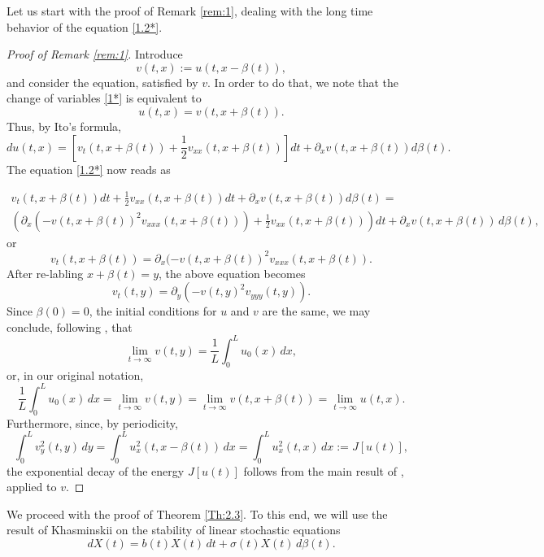 \documentclass[a4paper,12pt]{article}
\numberwithin{equation}{section}
\def\d{\partial}
\begin{document}
Let us start with the proof of Remark \ref{rem:1}, dealing with the long time behavior of the equation \eqref{1.2*}.
\begin{proof}[Proof of Remark \ref{rem:1}] Introduce 
\begin{equation}\label{1*}
v(t,x):=u(t, x - \beta(t)),
\end{equation}
and consider the equation, satisfied by $v$. In order to do that, we note that the change of variables \eqref{1*} is equivalent to 
\[
u(t,x) = v(t, x + \beta(t)).
\]
Thus, by Ito's formula,
\[
du(t,x) = [v_t(t,x+\beta(t)) + \frac{1}{2}v_{xx}(t,x+\beta(t))] dt + \d_x v(t,x+\beta(t)) d\beta(t).
\]
The equation \eqref{1.2*} now reads as

\begin{multline*}
v_t(t,x+\beta(t)) dt + \frac{1}{2}v_{xx}(t,x+\beta(t)) dt + \d_x v(t,x+\beta(t)) d\beta(t)  = \\ \left(\partial_x(-v(t,x+\beta(t))^{2}v_{xxx}(t,x+\beta(t))) + \frac{1}{2}  v_{xx}(t,x+\beta(t)) \right)dt +
\partial_x v(t,x+\beta(t)) \, d \beta(t),
\end{multline*}
or
\[
v_t(t,x+\beta(t))  = \partial_x(-v(t,x+\beta(t))^{2}v_{xxx}(t,x+\beta(t)).
\]
After re-labling $x + \beta(t) = y$, the above equation becomes
\begin{equation*}
v_t(t,y)  = \partial_y(-v(t,y)^{2}v_{yyy}(t,y)).
\end{equation*}
Since $\beta(0) = 0$, the initial conditions for $u$ and $v$ are the same, we may conclude, following \cite{DalPas, BertPugh}, that
\begin{equation*}\label{1.4}
 \lim_{t \to \infty}v(t,y) = \frac{1}{L} \int_0^L u_0(x) \, dx,
 \end{equation*}
or, in our original notation, 
\[
\frac{1}{L} \int_0^L u_0(x) \, dx =  \lim_{t \to \infty}v(t,y)  =  \lim_{t \to \infty}v(t,x+\beta(t)) = \lim_{t \to \infty}u(t,x).
\]
Furthermore, since, by periodicity,
\[
\int_{0}^{L} v_y^2(t,y) \, dy = \int_{0}^{L} u_x^2(t,x-\beta(t)) \, dx  = \int_{0}^{L} u_x^2(t,x) \, dx:= J[u(t)], 
\]
the exponential decay of the energy $J[u(t)]$ follows from the main result of \cite{Tud}, applied to $v$.
\end{proof}

We proceed with the proof of Theorem \ref{Th:2.3}. To this end, we will use the result of Khasminskii \cite{Khas} on the stability of linear stochastic equations
\begin{equation}
dX(t) = b(t)X(t)\,dt + \sigma(t)X(t)\,d\beta(t).
\label{6.1}
\end{equation}
\end{document}
